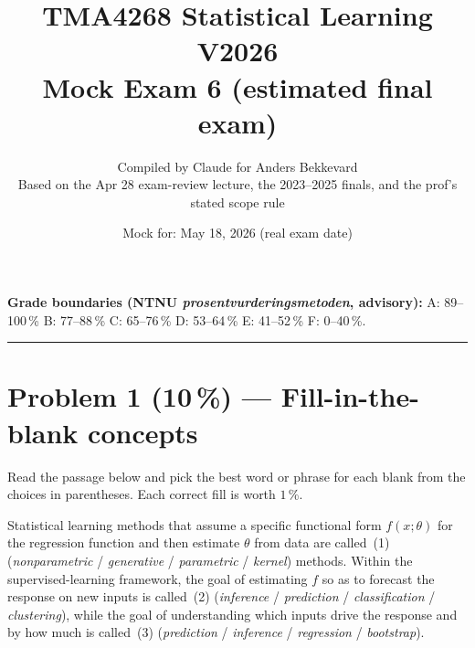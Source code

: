 \documentclass[11pt,a4paper]{article}
\title{TMA4268 Statistical Learning V2026\\[0.3em]
\large Mock Exam 6 (estimated final exam)}
\author{Compiled by Claude for Anders Bekkevard\\[0.2em]
\small Based on the Apr 28 exam-review lecture, the 2023--2025 finals, and the prof's stated scope rule}
\date{Mock for: May 18, 2026 (real exam date)}
\newcommand{\points}[1]{\textbf{(#1\,\%)}}
\begin{document}
\maketitle

\noindent{}

\vspace{0.6em}
\noindent\textbf{Grade boundaries (NTNU \emph{prosentvurderingsmetoden}, advisory):}
A: 89--100\,\% \quad B: 77--88\,\% \quad C: 65--76\,\% \quad D: 53--64\,\% \quad E: 41--52\,\% \quad F: 0--40\,\%.

\vspace{1em}
\hrule
\vspace{1em}

\section*{Problem 1 \points{10} --- Fill-in-the-blank concepts}

\noindent Read the passage below and pick the best word or phrase for each blank from the choices in parentheses. Each correct fill is worth $1$\,\%.

\bigskip

Statistical learning methods that assume a specific functional form $f(x;\theta)$ for the regression function and then estimate $\theta$ from data are called \underline{\hspace{2.5cm}}\,(1) (\emph{nonparametric} / \emph{generative} / \emph{parametric} / \emph{kernel}) methods. Within the supervised-learning framework, the goal of estimating $f$ so as to forecast the response on new inputs is called \underline{\hspace{2.5cm}}\,(2) (\emph{inference} / \emph{prediction} / \emph{classification} / \emph{clustering}), while the goal of understanding which inputs drive the response and by how much is called \underline{\hspace{2.5cm}}\,(3) (\emph{prediction} / \emph{inference} / \emph{regression} / \emph{bootstrap}).
\end{document}
